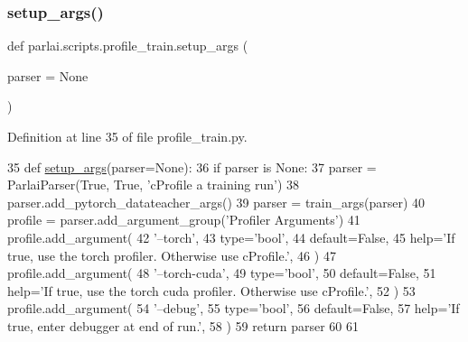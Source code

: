 \subsubsection{\texorpdfstring{setup\+\_\+args()}{setup\_args()}}
{\footnotesize\ttfamily def parlai.\+scripts.\+profile\+\_\+train.\+setup\+\_\+args (\begin{DoxyParamCaption}\item[{}]{parser = {\ttfamily None} }\end{DoxyParamCaption})}



Definition at line 35 of file profile\+\_\+train.\+py.


\begin{DoxyCode}
35 \textcolor{keyword}{def }\hyperlink{namespaceparlai_1_1scripts_1_1profile__train_abc73daf8a16d21ce56906342ec15cda9}{setup\_args}(parser=None):
36     \textcolor{keywordflow}{if} parser \textcolor{keywordflow}{is} \textcolor{keywordtype}{None}:
37         parser = ParlaiParser(\textcolor{keyword}{True}, \textcolor{keyword}{True}, \textcolor{stringliteral}{'cProfile a training run'})
38     parser.add\_pytorch\_datateacher\_args()
39     parser = train\_args(parser)
40     profile = parser.add\_argument\_group(\textcolor{stringliteral}{'Profiler Arguments'})
41     profile.add\_argument(
42         \textcolor{stringliteral}{'--torch'},
43         type=\textcolor{stringliteral}{'bool'},
44         default=\textcolor{keyword}{False},
45         help=\textcolor{stringliteral}{'If true, use the torch profiler. Otherwise use cProfile.'},
46     )
47     profile.add\_argument(
48         \textcolor{stringliteral}{'--torch-cuda'},
49         type=\textcolor{stringliteral}{'bool'},
50         default=\textcolor{keyword}{False},
51         help=\textcolor{stringliteral}{'If true, use the torch cuda profiler. Otherwise use cProfile.'},
52     )
53     profile.add\_argument(
54         \textcolor{stringliteral}{'--debug'},
55         type=\textcolor{stringliteral}{'bool'},
56         default=\textcolor{keyword}{False},
57         help=\textcolor{stringliteral}{'If true, enter debugger at end of run.'},
58     )
59     \textcolor{keywordflow}{return} parser
60 
61 
\end{DoxyCode}
